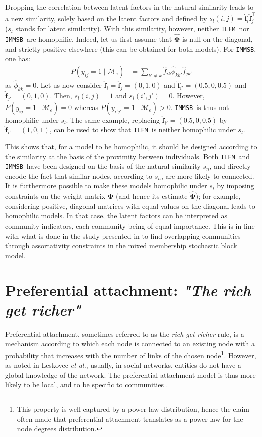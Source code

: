 \documentclass{llncs}
\newcommand{\ifm}{\texttt{ILFM}}
\newcommand{\imb}{\texttt{IMMSB}}
\newcommand{\pr}{P}
\newcommand{\M}{\mathcal{M}}
\newcommand{\mat}[1]{\mathbf{#1}}
\begin{document}
Dropping the correlation between latent factors in the natural similarity leads to a new similarity, solely based on the latent factors and defined by $s_l(i,j) = \mat{\hat{f}}_{i} \mat{\hat{f}}_j^\top \nonumber$ ($s_l$ stands for latent similarity). With this similarity, however, neither \ifm\  nor \imb\ are homophilic. Indeed, let us first assume that $\mat{\hat{\Phi}}$ is null on the diagonal, and strictly positive elsewhere (this can be obtained for both models). For \imb, one has:
%
\begin{align}
\pr(y_{ij}=1 \mid \M_e) & = \sum_{k' \neq k} \hat{f}_{ik} \hat{\phi}_{kk'} \hat{f}_{jk'} \nonumber 
\end{align}
%
as $\hat{\phi}_{kk} = 0$. Let us now consider $\mat{\hat{f}}_i=\mat{\hat{f}}_j=(0,1,0)$ and $\mat{\hat{f}}_{i'}=(0.5,0,0.5)$ and $\mat{\hat{f}}_{j'}=(0,1,0)$. Then, $s_l(i,j)=1$ and $s_l(i',j')=0$. However, $\pr(y_{ij}=1 \mid \M_e) = 0$ whereas $\pr(y_{i'j'}=1 \mid \M_e) > 0$. \imb\ is thus not homophilic under $s_l$. The same example, replacing $\mat{\hat{f}}_{i'}=(0.5,0,0.5)$ by $\mat{\hat{f}}_{i'}=(1,0,1)$, can be used to show that \ifm\ is neither homophilic under $s_l$.

This shows that, for a model to be homophilic, it should be designed according to the similarity at the basis of the proximity between individuals. Both \ifm\ and \imb\ have been designed on the basis of the natural similarity $s_n$, and directly encode the fact that similar nodes, according to $s_n$, are more likely to connected.  It is furthermore possible to make these models homophilic under $s_l$ by imposing constraints on the weight matrix $\mat{\Phi}$ (and hence its estimate $\mat{\hat{\Phi}}$); for example, considering positive, diagonal matrices with equal values on the diagonal leads to homophilic models. In that case, the latent factors can be interpreted as community indicators, each community being of equal importance. This is in line with what is done in the study presented in \cite{AMMSB} to find overlapping communities through assortativity constraints in the mixed membership stochastic block model.

\section{Preferential attachment: \emph{"The rich get richer"}}
\label{sec:burstiness}

Preferential attachment, sometimes referred to as the \textit{rich get richer} rule, is a mechanism according to which each node is connected to an existing node with a probability that increases with the number of links of the chosen node\footnote{This property is well captured by a power law distribution, hence the claim often made that preferential attachment translates as a power law for the node degrees distribution.}. However, as noted in Leskovec \textit{et al.}, usually, in social networks, entities do not have a global knowledge of the network. The preferential attachment model is thus more likely to be local, and to be specific to communities \cite{LeskovecBKT08}.
\end{document}

